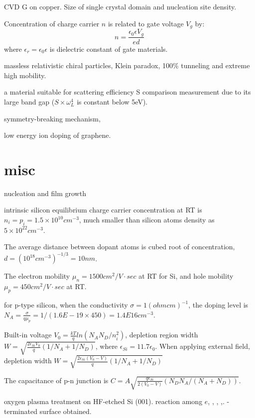 CVD G on copper. Size of single crystal domain and nucleation site density.\cite{Wu2013b}

Concentration of charge carrier $n$ is related to gate voltage $V_g$ by:
\[
n = \frac{\epsilon_0 \epsilon V_g}{ed}
\]
where $\epsilon_r = \epsilon_0 \epsilon$ is dielectric constant of gate materials.

massless relativistic chiral particles, Klein paradox, 100\% tunneling and extreme high mobility.

 a material suitable for scattering efficiency S comparison measurement due to its large band gap ($S\times \omega_L^4$ is constant below 5eV).

symmetry-breaking mechanism,

low energy ion doping of graphene.\cite{Ahlgren2011}

\section{misc}
nucleation and film growth \cite{Hanbucken1984}

intrinsic silicon equilibrium charge carrier concentration at RT is $n_i = p_i = 1.5 \times 10^{10} cm^{-3}$, much smaller than silicon atoms density as $5\times 10 ^{22} cm^{-3}$.

The average distance between dopant atoms is cubed root of concentration, $d = (10^{18} cm^{-3})^{-1/3} = 10nm$.

The electron mobility $\mu_n = 1500 cm^2/V\cdot sec $ at RT for Si, and hole mobility $\mu_p = 450 cm^2/V\cdot sec$ at RT.

for p-type silicon, when the conductivity $\sigma = 1 (ohm cm )^{-1}$, the doping level is
$N_A = \frac{\sigma}{q \mu_p}= 1 / (1.6E-19 \times 450) = 1.4E16 cm^{-3}$.

Built-in voltage $V_0 = \frac{kT}{q}ln(N_A N_D/n_i^2)$, depletion region width $W = \sqrt{\frac{2 \epsilon_{Si} V_0}{q}(1/N_A + 1/N_D)}$, where $\epsilon_{Si} = 11.7 \epsilon_0$. When applying external field, depletion width $W = \sqrt{\frac{2 \epsilon_{Si} (V_0 - V) }{q}(1/N_A + 1/N_D)}$

The capacitance of p-n junction is $C = A \sqrt{\frac{q \epsilon_{Si}}{2(V_0 -V)}(N_D N_A/(N_A + N_D))}$.


oxygen plasma treatment on HF-etched Si (001). reaction among $e$, , , ,. -terminated surface obtained.\cite{Habib2010}

